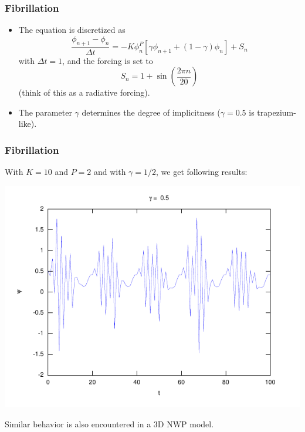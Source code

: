 \documentclass[aspectratio=43,9pt]{beamer}
\begin{document}
%
%
\begin{frame}
	\frametitle{Fibrillation}
	\begin{itemize}
		\item The equation is discretized as
			\begin{equation*}
				\frac{\phi_{n+1} - \phi_n}{\Delta t} = - K \phi_n^P \left[ \gamma \phi_{n+1} + (1-\gamma) \phi_n \right] + S_n
			\end{equation*}
			with $\Delta t =1$, and the forcing is set to
			\begin{equation*}
				S_n = 1 + \sin \left (\frac{2 \pi n}{20}\right)
			\end{equation*}
			(think of this as a radiative forcing).
		\item The parameter $\gamma$ determines the degree of implicitness ($\gamma=0.5$ is trapezium-like).
	\end{itemize}
\end{frame}
%
%
\begin{frame}
	\frametitle{Fibrillation}
	With $K=10$ and $P=2$ and with $\gamma=1/2$, we get following results:
	\begin{center}
		\includegraphics[scale=0.8]{fib_a}
	\end{center}
	\par
	Similar behavior is also encountered in a 3D NWP model.
\end{frame}
%
\end{document}

